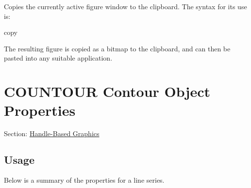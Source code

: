 Copies the currently active figure window to the clipboard. The syntax for its use is\-: \begin{DoxyVerb}   copy
\end{DoxyVerb}
 The resulting figure is copied as a bitmap to the clipboard, and can then be pasted into any suitable application. \hypertarget{handle_countour}{}\section{C\-O\-U\-N\-T\-O\-U\-R Contour Object Properties}\label{handle_countour}
Section\-: \hyperlink{sec_handle}{Handle-\/\-Based Graphics} \hypertarget{vtkwidgets_vtkxyplotwidget_Usage}{}\subsection{Usage}\label{vtkwidgets_vtkxyplotwidget_Usage}
Below is a summary of the properties for a line series. 

